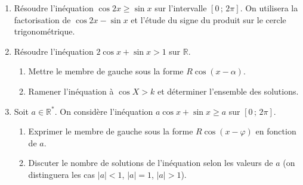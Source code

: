 \documentclass[11pt]{article}
\begin{document}
\begin{exercice}
\begin{enumerate}
    \item Résoudre l'inéquation $\cos 2x \geqslant \sin x$ sur l'intervalle $[0\,;\, 2\pi]$. On utilisera la factorisation de $\cos 2x - \sin x$ et l'étude du signe du produit sur le cercle trigonométrique.
    \item Résoudre l'inéquation $2\cos x + \sin x > 1$ sur $\mathbb{R}$.
    \begin{enumerate}
        \item Mettre le membre de gauche sous la forme $R\cos(x-\alpha)$.
        \item Ramener l'inéquation à $\cos X > k$ et déterminer l'ensemble des solutions.
    \end{enumerate}
    \item Soit $a \in \mathbb{R}^*$. On considère l'inéquation $a\cos x + \sin x \geqslant a$ sur $[0\,;\, 2\pi]$.
    \begin{enumerate}
        \item Exprimer le membre de gauche sous la forme $R\cos(x-\varphi)$ en fonction de $a$.
        \item Discuter le nombre de solutions de l'inéquation selon les valeurs de $a$ (on distinguera les cas $|a| < 1$, $|a| = 1$, $|a| > 1$).
    \end{enumerate}
\end{enumerate}
\end{exercice}
\end{document}
